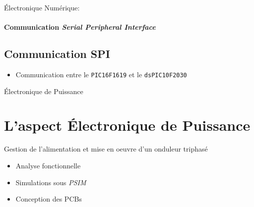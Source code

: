 \documentclass{beamer}
\begin{document}
	\begin{frame}{Électronique Numérique:}
	\framesubtitle{Communication \textit{Serial Peripheral Interface}}
		\subsection[SPI]{Communication SPI}
		\begin{itemize}
		    \item Communication entre le \texttt{PIC16F1619} et le \texttt{dsPIC10F2030}
		\end{itemize}
	\end{frame}
	
	\author[]{Florian POUTHIER}
	\begin{frame}{Électronique de Puissance}
		\section[ENPU]{L'aspect Électronique de Puissance}
		Gestion de l'alimentation et mise en oeuvre d'un onduleur triphasé
 		\begin{itemize}
			\item Analyse fonctionnelle
			\item Simulations sous \textit{PSIM}
			\item Conception des PCBs
		\end{itemize}
	\end{frame}
	
\end{document}
